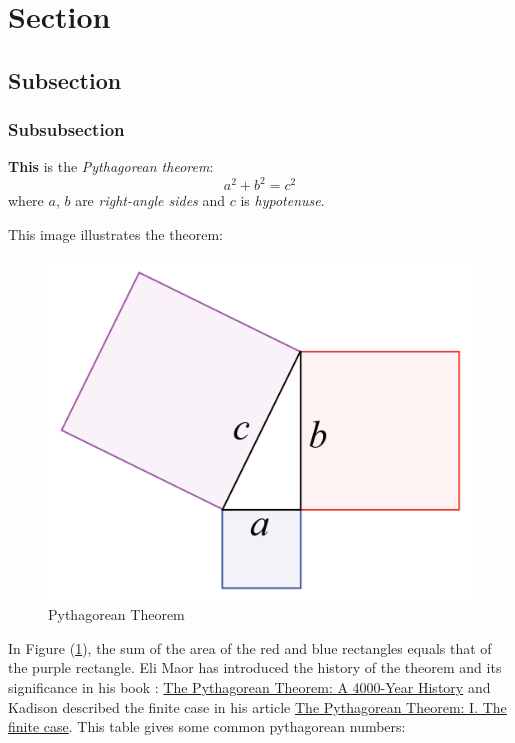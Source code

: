 \documentclass{article} %
\title{\ttfamily{Example}}
\author{\sffamily{jan\_chen}}
\date{\texttt{September 2023}}
\begin{document}
\maketitle

\tableofcontents

\section{Section}
\subsection{Subsection}
\subsubsection{Subsubsection}

{\large \textbf{This}} is the \textit{Pythagorean theorem}:
\begin{equation}
    a^2 + b^2 = c^2
\end{equation}
where $a$, $b$ are \textit{right-angle sides} and $c$ is \textit{hypotenuse}.

This image illustrates the theorem:
\begin{figure}[H]
    \centering
    \includegraphics[scale = 0.06]{image/pythagorean th.png}
    \caption{Pythagorean Theorem}
    \label{fig:enter-label}
\end{figure}

In Figure (\ref{fig:enter-label}), the sum of the area of the red and blue rectangles equals that of the purple rectangle. Eli Maor has introduced the history of the theorem and its significance in his book \cite{ref1}: \href{https://books.google.com.sg/books?id=XuWZDwAAQBAJ&dq=pythagorean+theorem&lr=&hl=zh-CN&source=gbs_navlinks_s}{The Pythagorean Theorem: A 4000-Year History} and Kadison described the finite case in his article \cite{ref2} \href{https://doi.org/10.1073/pnas.032677199}{The Pythagorean Theorem: I. The finite case}.
This table gives some common pythagorean numbers:
\end{document}
